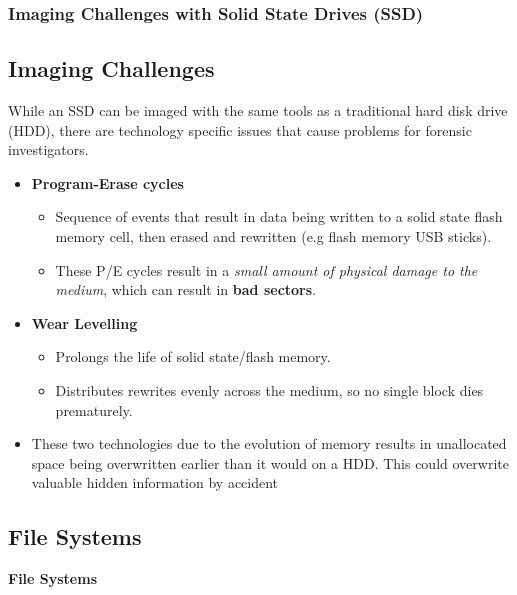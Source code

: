 \documentclass{beamer}
\begin{document}
\begin{frame}
	\frametitle{Imaging Challenges with Solid State Drives (SSD)}
	\subsection*{Imaging Challenges}
	While an SSD can be imaged with the same tools as a traditional hard disk drive (HDD), there are technology specific issues that cause problems for forensic investigators.
	\begin{itemize}
		\item \textbf{Program-Erase cycles}
			\begin{itemize}
				\item Sequence of events that result in data being written to a solid state flash memory cell, then erased and rewritten (e.g flash memory USB sticks). 
				\item These P/E cycles result in a \textit{small amount of physical damage to the medium}, which can result in \textbf{bad sectors}.
			\end{itemize}
		\item \textbf{Wear Levelling}
			\begin{itemize}
				\item Prolongs the life of solid state/flash memory.
				\item Distributes rewrites evenly across the medium, so no single block dies prematurely.
			\end{itemize}
		\item These two technologies due to the evolution of memory results in unallocated space being overwritten earlier than it would on a HDD. This could overwrite valuable hidden information by accident
	\end{itemize}
\end{frame}

\begin{frame}%
	\section{File Systems}
	\begin{center}
		\Huge\textbf{File Systems}
	\end{center}
\end{frame}
\end{document}

